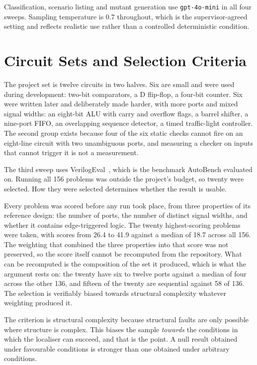 \documentclass[11pt,a4paper,titlepage=false]{scrreprt}
\begin{document}
Classification, scenario listing and mutant generation use \texttt{gpt-4o-mini} in all four
sweeps. Sampling temperature is 0.7 throughout, which is the supervisor-agreed setting and
reflects realistic use rather than a controlled deterministic condition.

\section{Circuit Sets and Selection Criteria}\label{sec:exp-circuits}

The project set is twelve circuits in two halves. Six are small and were used during
development: two-bit comparators, a D flip-flop, a four-bit counter. Six were written later
and deliberately made harder, with more ports and mixed signal widths: an eight-bit ALU with
carry and overflow flags, a barrel shifter, a nine-port FIFO, an overlapping sequence
detector, a timed traffic-light controller. The second group exists because four of the six
static checks cannot fire on an eight-line circuit with two unambiguous ports, and measuring
a checker on inputs that cannot trigger it is not a measurement.

The third sweep uses VerilogEval~\cite{liu2023verilogeval}, which is the benchmark AutoBench
evaluated on. Running all 156 problems was outside the project's budget, so twenty were
selected. How they were selected determines whether the result is usable.

Every problem was scored before any run took place, from three properties of its reference
design: the number of ports, the number of distinct signal widths, and whether it contains
edge-triggered logic. The twenty highest-scoring problems were taken, with scores from 26.4
to 41.9 against a median of 18.7 across all 156. The weighting that combined the three
properties into that score was not preserved, so the score itself cannot be recomputed from
the repository. What can be recomputed is the composition of the set it produced, which is
what the argument rests on: the twenty have six to twelve ports against a median of four
across the other 136, and fifteen of the twenty are sequential against 58 of 136. The
selection is verifiably biased towards structural complexity whatever weighting produced
it.

The criterion is structural complexity because structural faults are only possible where
structure is complex. This biases the sample \emph{towards} the conditions in which the
localiser can succeed, and that is the point. A null result obtained under favourable
conditions is stronger than one obtained under arbitrary conditions.
\end{document}
